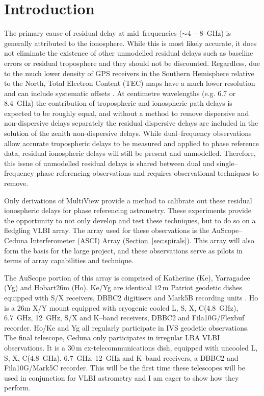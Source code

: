 \section{Introduction}
	The primary cause of residual delay at mid--frequencies ($\sim4-8$~GHz) is generally attributed to the ionosphere. While this is most likely accurate, it does not eliminate the existence of other unmodelled residual delays such as baseline errors or residual troposphere and they should not be discounted. Regardless, due to the much lower density of GPS receivers in the Southern Hemisphere relative to the North, Total Electron Content (TEC) maps have a much lower resolution and can include systematic offsets \citep{WalkerChatterjee1999}. At centimetre wavelengths (e.g. 6.7 or 8.4~GHz) the contribution of tropospheric and ionospheric path delays is expected to be roughly equal, and without a method to remove dispersive and non-dispersive delays separately the residual dispersive delays are included in the solution of the zenith non-dispersive delays. While dual--frequency observations allow accurate tropospheric delays to be measured and applied to phase reference data, residual ionospheric delays will still be present and unmodelled. Therefore, this issue of unmodelled residual delays is shared between dual and single--frequency phase referencing observations and requires observational techniques to remove.
	
	Only derivations of MultiView provide a method to calibrate out these residual ionospheric delays for phase referencing astrometry. These experiments provide the opportunity to not only develop and test these techniques, but to do so on a fledgling VLBI array. The array used for these observations is the AuScope--Ceduna Interferometer (ASCI) Array (\hyperref[sec:spirals]{Section~\ref*{sec:spirals}}). This array will also form the basis for the \spirals\space large project, and these observations serve as pilots in terms of array capabilities and technique. 
	
	The AuScope portion of this array is comprised of Katherine (Ke), Yarragadee (Yg) and Hobart26m (Ho). Ke/Yg are identical $12$\,m Patriot geodetic dishes equipped with S/X receivers, DBBC2 digitisers and Mark5B recording units \citep{Lovell2013}. Ho is a 26m X/Y mount equipped with cryogenic cooled L, S, X, C(4.8~GHz), 6.7~GHz, 12~GHz, S/X and K--band receivers, DBBC2 and Fila10G/Flexbuf recorder. Ho/Ke and Yg all regularly participate in IVS geodetic observations. The final telescope, Ceduna \citep[Cd; ][]{McCulloch2005} only participates in irregular LBA VLBI observations. It is a 30\,m ex-telecommunications dish, equipped with uncooled L, S, X, C(4.8~GHz), 6.7~GHz, 12~GHz and K--band receivers, a DBBC2 and Fila10G/Mark5C recorder. This will be the first time these telescopes will be used in conjunction for VLBI astrometry and I am eager to show how they perform.

